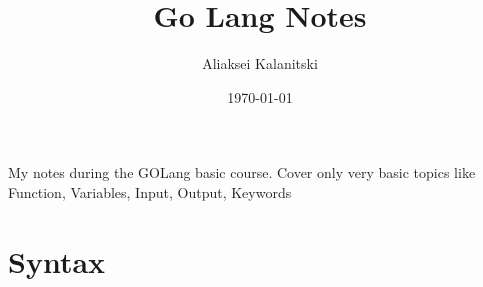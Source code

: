 \documentclass[12pt]{article}
\begin{document}
\title{Go Lang Notes}
\author{Aliaksei Kalanitski}
\date{\today}
\maketitle

My notes during the GOLang basic course. Cover only very basic topics like
Function, Variables, Input, Output, Keywords

\begin{multicols}{2}
    \tableofcontents
\end{multicols}
\newpage


\section{Syntax}
\end{document}
